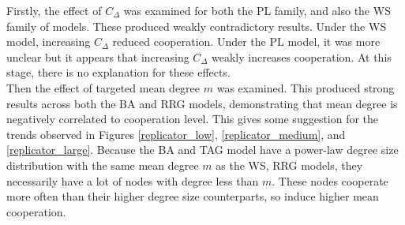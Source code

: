 Firstly, the effect of $C_\Delta$ was examined for both the PL family, and also the WS family of models. These produced weakly contradictory results. Under the WS model, increasing $C_\Delta$ reduced cooperation. Under the PL model, it was more unclear but it appears that increasing $C_\Delta$ weakly increases cooperation. At this stage, there is no explanation for these effects. \\

Then the effect of targeted mean degree $m$ was examined. This produced strong results across both the BA and RRG models, demonstrating that mean degree is negatively correlated to cooperation level. This gives some suggestion for the trends observed in Figures \ref{replicator_low}, \ref{replicator_medium}, and \ref{replicator_large}. Because the BA and TAG model have a power-law degree size distribution with the same mean degree $m$ as the WS, RRG models, they necessarily have a lot of nodes with degree less than $m$. These nodes cooperate more often than their higher degree size counterparts, so induce higher mean cooperation. 

